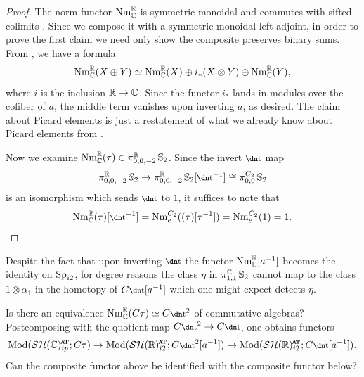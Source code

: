 \begin{proof}
  The norm functor $\mathrm{Nm}_{\mathbb{C}}^{\mathbb{R}}$ is symmetric monoidal and commutes with sifted colimits \cite[Proposition 4.5]{norms}. Since we compose it with a symmetric monoidal left adjoint, in order to prove the first claim we need only show the composite preserves binary sums. From \cite[Corollary 5.13]{norms}, we have a formula
  \[ \mathrm{Nm}_{\mathbb{C}}^{\mathbb{R}}(X \oplus Y) \simeq \mathrm{Nm}_{\mathbb{C}}^{\mathbb{R}}(X) \oplus i_*(X \otimes Y) \oplus \mathrm{Nm}_{\mathbb{C}}^{\mathbb{R}}(Y), \]
  where $i$ is the inclusion $\mathbb{R} \to \mathbb{C}$. Since the functor $i_*$ lands in modules over the cofiber of $a$, the middle term vanishes upon inverting $a$, as desired.
  The claim about Picard elements is just a restatement of what we already know about Picard elements from .

  Now we examine $\mathrm{Nm}_{\mathbb{C}}^{\mathbb{R}}(\tau) \in \pi_{0,0,-2}^{\mathbb{R}} \operatorname{\mathbb{S}}_2$.
  Since the invert $\ta$ map
  \[\pi_{0,0,-2} ^{\R} \Ss_2 \to \pi_{0,0,-2} ^{\R} \Ss_2 [\ta^{-1}] \cong \pi_{0,0} ^{C_2} \Ss_2\]
  is an isomorphism which sends $\ta$ to $1$, it suffices to note that  \[\mathrm{Nm}_\C^\R(\tau)[\ta^{-1}] = \mathrm{Nm}_e^{C_2}((\tau)[\tau^{-1}]) = \mathrm{Nm}_e^{C_2}(1) = 1. \qedhere\]
\end{proof}

\begin{rmk}
  Despite the fact that upon inverting $\ta$ the functor $\mathrm{Nm}_{\mathbb{C}} ^{\mathbb{R}} [a^{-1}]$ becomes the identity on $\operatorname{\mathrm{Sp}}_{i2}$, for degree reasons the class $\eta$ in $\pi_{1,1}^{\mathbb{C}} \operatorname{\mathbb{S}}_2$ cannot map to the class $1 \otimes \alpha_{1}$ in the homotopy of $C\ta[a^{-1}]$ which one might expect detects $\eta$. 
\end{rmk}

\begin{qst} \label{cnj:72}
Is there an equivalence $\mathrm{Nm}^{\R} _\C (C\tau) \simeq C\ta^2$ of commutative algebras? Postcomposing with the quotient map $C\ta^2 \to C\ta$, one obtains functors
\[ \Mod ( \SHCat ; C\tau) \to \Mod ( \SHRat ; C\ta^2 [a^{-1}]) \to \Mod ( \SHRat ; C\ta [a^{-1}]).\]
  Can the composite functor above be identified with the composite functor below?
\begin{center}  \end{center}
\end{qst}

